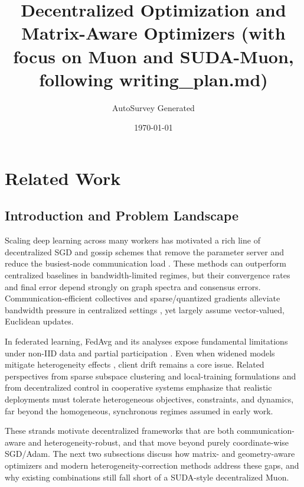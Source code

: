 \documentclass[11pt]{article}
\title{Decentralized Optimization and Matrix-Aware Optimizers (with focus on Muon and SUDA-Muon, following writing_plan.md)}
\author{AutoSurvey Generated}
\date{\today}
\begin{document}
\maketitle

\section{Related Work}

\subsection{Introduction and Problem Landscape}

Scaling deep learning across many workers has motivated a rich line of decentralized SGD and gossip schemes that remove the parameter server and reduce the busiest-node communication load \citep{lian2017can, Lian2017AsynchronousDP, Assran2018StochasticGP, blot2016gossip, Blot2018GoSGDDO, daily2018gossipgrad}. These methods can outperform centralized baselines in bandwidth-limited regimes, but their convergence rates and final error depend strongly on graph spectra and consensus errors. Communication-efficient collectives and sparse/quantized gradients alleviate bandwidth pressure in centralized settings \citep{Renggli2018SparCMLHS, Bernstein2018signSGDCO, stich2018sparsified, Vogels2019PowerSGDPL}, yet largely assume vector-valued, Euclidean updates.

In federated learning, FedAvg and its analyses expose fundamental limitations under non-IID data and partial participation \citep{li2019convergence, Haddadpour2020FederatedLW, su2023non}. Even when widened models mitigate heterogeneity effects \citep{jian2025widening}, client drift remains a core issue. Related perspectives from sparse subspace clustering and local-training formulations \citep{Yang2015LearningW, Hinton2022TheFA} and from decentralized control in cooperative systems \citep{goldman2004decentralized} emphasize that realistic deployments must tolerate heterogeneous objectives, constraints, and dynamics, far beyond the homogeneous, synchronous regimes assumed in early work.

These strands motivate decentralized frameworks that are both communication-aware and heterogeneity-robust, and that move beyond purely coordinate-wise SGD/Adam. The next two subsections discuss how matrix- and geometry-aware optimizers and modern heterogeneity-correction methods address these gaps, and why existing combinations still fall short of a SUDA-style decentralized Muon.
\end{document}
